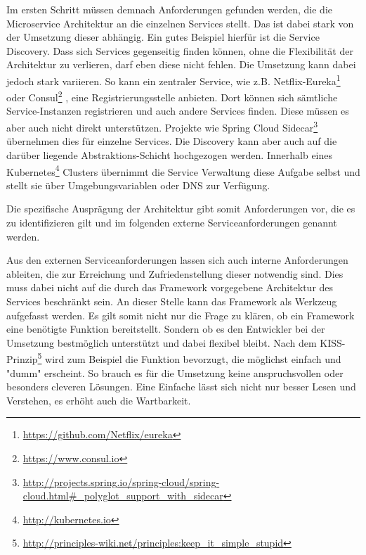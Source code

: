 
Im ersten Schritt müssen demnach Anforderungen gefunden werden, die die Microservice Architektur an die einzelnen Services stellt. Das ist dabei stark von der Umsetzung dieser abhängig. Ein gutes Beispiel hierfür ist die Service Discovery. Dass sich Services gegenseitig finden können, ohne die Flexibilität der Architektur zu verlieren, darf eben diese nicht fehlen. Die Umsetzung kann dabei jedoch stark variieren. So kann ein zentraler Service, wie z.B. Netflix-Eureka\footnote{
\url{https://github.com/Netflix/eureka}
}
oder Consul\footnote{
\url{https://www.consul.io}
}
, eine Registrierungsstelle anbieten. Dort können sich sämtliche Service-Instanzen registrieren und auch andere Services finden. Diese müssen es aber auch nicht direkt unterstützen. Projekte wie Spring Cloud Sidecar\footnote{
\url{http://projects.spring.io/spring-cloud/spring-cloud.html\#_polyglot_support_with_sidecar}
}
übernehmen dies für einzelne Services. Die Discovery kann aber auch auf die darüber liegende Abstraktions-Schicht hochgezogen werden. Innerhalb eines Kubernetes\footnote{
\url{http://kubernetes.io}
}
Clusters übernimmt die Service Verwaltung diese Aufgabe selbst und stellt sie über Umgebungsvariablen oder DNS zur Verfügung. 


Die spezifische Ausprägung der Architektur gibt somit Anforderungen vor, die es zu identifizieren gilt und im folgenden externe Serviceanforderungen genannt werden.


Aus den externen Serviceanforderungen lassen sich auch interne Anforderungen ableiten, die zur Erreichung und Zufriedenstellung dieser notwendig sind. Dies muss dabei nicht auf die durch das Framework vorgegebene Architektur des Services beschränkt sein. An dieser Stelle kann das Framework als Werkzeug aufgefasst werden. Es gilt somit nicht nur die Frage zu klären, ob ein Framework eine benötigte Funktion bereitstellt. Sondern ob es den Entwickler bei der Umsetzung bestmöglich unterstützt und dabei flexibel bleibt. Nach dem KISS-Prinzip\footnote{
\url{http://principles-wiki.net/principles:keep_it_simple_stupid}
} 
wird zum Beispiel die Funktion bevorzugt, die möglichst einfach und "dumm" erscheint. So brauch es für die Umsetzung keine anspruchsvollen oder besonders cleveren Lösungen. Eine Einfache lässt sich nicht nur besser Lesen und Verstehen, es erhöht auch die Wartbarkeit.  

